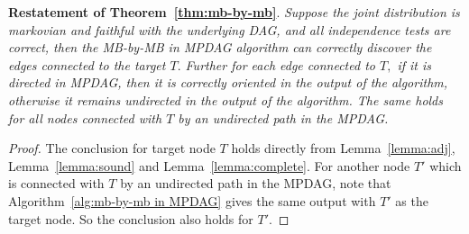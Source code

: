 \documentclass{article}
\begin{document}
\textbf{Restatement of Theorem~\ref{thm:mb-by-mb}}. 
\textit{Suppose the joint distribution is markovian and faithful with the underlying DAG, and all independence tests are correct, then the MB-by-MB in MPDAG algorithm can correctly discover the edges connected to the target $T.$ Further for each edge connected to $T,$ if it is directed in MPDAG, then it is correctly oriented in the output of the algorithm, otherwise it remains undirected in the output of the algorithm. The same holds for all nodes connected with $T$ by an undirected path in the MPDAG.}

\begin{proof}
The conclusion for target node $T$ holds directly from Lemma~\ref{lemma:adj}, Lemma~\ref{lemma:sound} and Lemma~\ref{lemma:complete}. For another node $T'$ which is connected with $T$ by an undirected path in the MPDAG, note that Algorithm~\ref{alg:mb-by-mb in MPDAG} gives the same output with $T'$ as the target node. So the conclusion also holds for $T'.$
\end{proof}
\end{document}
